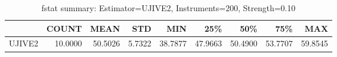 \begin{table}[ht]
\centering
\caption{fstat summary: Estimator=UJIVE2, Instruments=200, Strength=0.10}
\begin{tabular}{lrrrrrrrr}
\toprule
 & COUNT & MEAN & STD & MIN & 25\% & 50\% & 75\% & MAX \\
\midrule
UJIVE2 & 10.0000 & 50.5026 & 5.7322 & 38.7877 & 47.9663 & 50.4900 & 53.7707 & 59.8545 \\
\bottomrule
\end{tabular}
\end{table}
